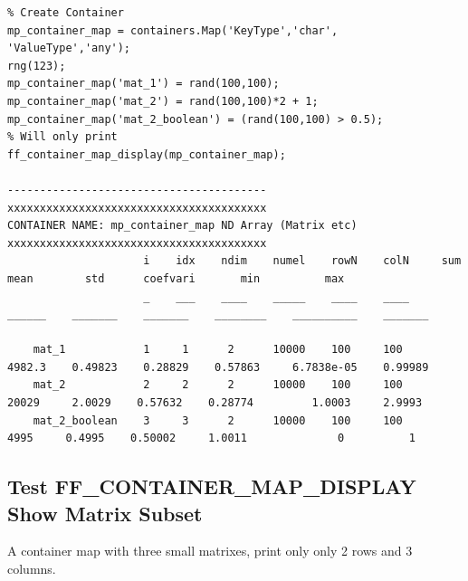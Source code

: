 \documentclass[
]{book}
\begin{document}
\begin{verbatim}
% Create Container
mp_container_map = containers.Map('KeyType','char', 'ValueType','any');
rng(123);
mp_container_map('mat_1') = rand(100,100);
mp_container_map('mat_2') = rand(100,100)*2 + 1;
mp_container_map('mat_2_boolean') = (rand(100,100) > 0.5);
% Will only print 
ff_container_map_display(mp_container_map);

----------------------------------------
xxxxxxxxxxxxxxxxxxxxxxxxxxxxxxxxxxxxxxxx
CONTAINER NAME: mp_container_map ND Array (Matrix etc)
xxxxxxxxxxxxxxxxxxxxxxxxxxxxxxxxxxxxxxxx
                     i    idx    ndim    numel    rowN    colN     sum       mean        std      coefvari       min          max  
                     _    ___    ____    _____    ____    ____    ______    _______    _______    ________    __________    _______

    mat_1            1     1      2      10000    100     100     4982.3    0.49823    0.28829    0.57863     6.7838e-05    0.99989
    mat_2            2     2      2      10000    100     100      20029     2.0029    0.57632    0.28774         1.0003     2.9993
    mat_2_boolean    3     3      2      10000    100     100       4995     0.4995    0.50002     1.0011              0          1
\end{verbatim}

\hypertarget{test-ff_container_map_display-show-matrix-subset}{%
\subsection{Test FF\_CONTAINER\_MAP\_DISPLAY Show Matrix Subset}\label{test-ff_container_map_display-show-matrix-subset}}

A container map with three small matrixes, print only only 2 rows and 3
columns.
\end{document}
